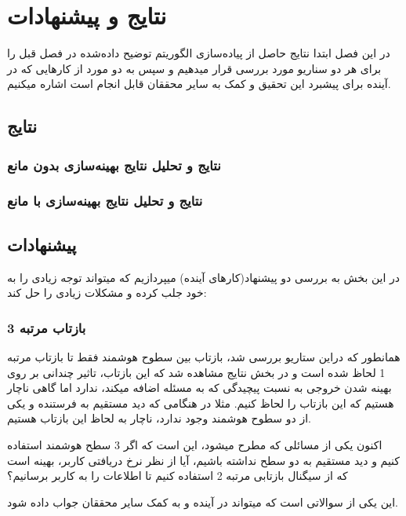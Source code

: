 \chapter{نتایج و پیشنهادات}
در این فصل ابتدا نتایج حاصل از پیاده‌سازی الگوریتم توضیح داده‌شده در فصل قبل را برای هر دو سناریو مورد بررسی قرار میدهیم و سپس به دو مورد از کارهایی که در آینده برای پیشبرد این تحقیق و کمک به سایر محققان قابل انجام است اشاره میکنیم.
\newpage
\section{نتایج}

\subsection{نتایج و تحلیل نتایج بهینه‌سازی بدون مانع}

\subsection{نتایج و تحلیل نتایج بهینه‌سازی با مانع}

\section{پیشنهادات}

در این بخش به بررسی دو پیشنهاد(کارهای آینده) میپردازیم که میتواند توجه زیادی را به خود جلب کرده و مشکلات زیادی را حل کند:

\subsection{بازتاب مرتبه 3}

همانطور که دراین ستاریو بررسی شد، بازتاب بین سطوح هوشمند فقط تا بازتاب مرتبه 1 لحاظ شده است و در بخش نتایج مشاهده شد که این بازتاب، تاثیر چندانی بر روی بهینه شدن خروجی به نسبت پیچیدگی که به مسئله اضافه میکند، ندارد اما گاهی ناچار هستیم که این بازتاب را لحاظ کنیم. مثلا در هنگامی که دید مستقیم به فرستنده و یکی از دو سطوح هوشمند وجود ندارد، ناچار به لحاظ این بازتاب هستیم. 

اکنون یکی از مسائلی که مطرح میشود، این است که اگر 3 سطح هوشمند استفاده کنیم و دید مستقیم به دو سطح نداشته باشیم، آیا از نظر  نرخ دریافتی کاربر، بهینه است که از سیگنال بازتابی مرتبه 2 استفاده کنیم تا اطلاعات را به کاربر برسانیم؟

این یکی از سوالاتی است که میتواند در آینده و به کمک سایر محققان جواب داده شود. 

